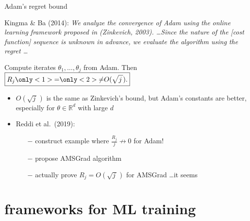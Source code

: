 \documentclass[svgnames,
               hyperref={colorlinks,citecolor=DeepPink4,linkcolor=FireBrick,urlcolor=Maroon},
               usepdftitle=false]  %
               {beamer}
\newcommand{\RR}{\mathbb{R}}
\newcommand{\ds}{\displaystyle}
\begin{document}
\begin{frame}{Adam's regret bound}

\noindent Kingma \& Ba (2014):  \emph{We analyze the convergence of Adam using the online learning framework proposed in (Zinkevich, 2003). \dots Since the nature of the [cost function] sequence is unknown in advance, we evaluate the algorithm using the regret \dots}

\medskip
\begin{block}{}
Compute iterates $\theta_1,\dots,\theta_j$ from Adam.  Then $\ds \boxed{R_j \only<1>{=}\only<2>{\ne} O(\sqrt{j\,}).}$
\end{block}

\begin{itemize}
\item $O(\sqrt{j\,})$ is the same as Zinkevich's bound, but Adam's constants are better, especially for $\theta \in \RR^d$ with large $d$
\item<2> Reddi et al.~(2019):
    \begin{itemize}
    \item[$-$] construct example where $\frac{R_j}{j} \nrightarrow 0$ for Adam!
    \item[$-$] propose AMSGrad algorithm
    \item[$-$] actually prove $R_j = O(\sqrt{j\,})$ for AMSGrad \dots it seems
    \end{itemize}
\end{itemize}
\end{frame}


\section{frameworks for ML training}
\end{document}
